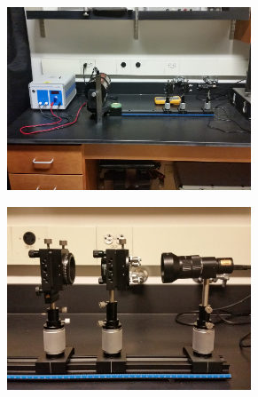 \documentclass[twocolumn]{article}
\begin{document}
	\begin{figure}
		\centering
		\begin{subfigure}{0.5\textwidth}
			\includegraphics[width = 0.8\textwidth]{Images/ExperimentOverview.jpg}
		\end{subfigure}%
		\begin{subfigure}{0.5\textwidth}
				\includegraphics[width = 0.8\textwidth]{Images/OpticsRail.jpg}
		\end{subfigure}%
	\end{figure}
	
\end{document}
